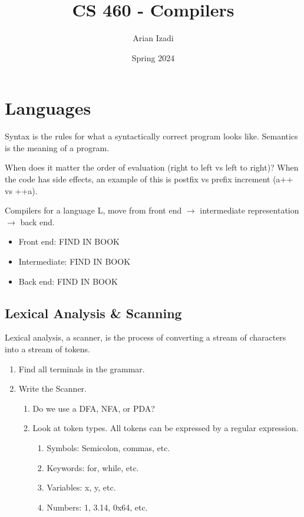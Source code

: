 \documentclass[twocolumn]{article}
\title{CS 460 {-} Compilers}
\author{Arian Izadi}
\date{Spring 2024}
\begin{document}
\maketitle

\section{Languages}

Syntax is the rules for what a syntactically correct program looks like.
Semantics is the meaning of a program.

When does it matter the order of evaluation (right to left vs left to right)?
When the code has side effects, an example of this is postfix vs prefix increment (a++ vs ++a).

Compilers for a language L, move from front end $\to$ intermediate representation $\to$ back end.

\begin{itemize}
  \item Front end: FIND IN BOOK
  \item Intermediate: FIND IN BOOK
  \item Back end: FIND IN BOOK
\end{itemize}

\subsection{Lexical Analysis \& Scanning}

Lexical analysis, a scanner, is the process of converting a stream of characters into a stream of tokens.

\begin{enumerate}
  \item Find all terminals in the grammar.
  \item Write the Scanner.
        \begin{enumerate}
          \item Do we use a DFA, NFA, or PDA{?}
          \item Look at token types. All tokens can be expressed by a regular expression.
                \begin{enumerate}
                  \item Symbols: Semicolon, commas, etc.
                  \item Keywords: for, while, etc.
                  \item Variables: x, y, etc.
                  \item Numbers: 1, 3.14, 0{x}64, etc.
                \end{enumerate}
        \end{enumerate}
\end{enumerate}
\end{document}
